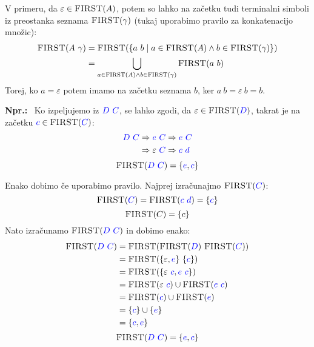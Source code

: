 \documentclass{article}
\newcommand{\Ex}{\textbf{Npr.:}\ }
\newcommand{\FIRST}{\textsc{FIRST}}
\newcommand{\Symbol}[1]{\textcolor{blue}{#1}}
\newcommand{\Null}{\varepsilon}
\newcommand{\Derive}{\Rightarrow}
\newcommand{\Seq}{\ }
\begin{document}
V primeru, da $\varepsilon \in \FIRST(A)$, potem so lahko na začetku tudi terminalni simboli iz preostanka seznama $\FIRST(\gamma)$ (tukaj uporabimo pravilo za konkatenacijo množic):
\begin{align*}
  \FIRST(A \Seq \gamma) &= \FIRST(\{a \Seq b \mid a \in \FIRST(A) \land b \in \FIRST(\gamma)\})\\
   &= \bigcup_{a \in \FIRST(A) \land b \in \FIRST(\gamma)} \FIRST(a \Seq b)
\end{align*}
Torej, ko $a = \Null$ potem imamo na začetku seznama $b$, ker $a \Seq b = \Null \Seq b = b$.

\Ex
  Ko izpeljujemo iz $\Symbol{D} \Seq \Symbol{C}$, se lahko zgodi, da $\Null \in \FIRST(\Symbol{D})$, takrat je na začetku $\Symbol{c} \in \FIRST(\Symbol{C})$:
  \begin{equation*}
    \Symbol{D} \Seq \Symbol{C} \begin{aligned}[t]
      &\Derive \Symbol{e} \Seq \Symbol{C} \Derive \Symbol{e} \Seq \Symbol{C} \\
      &\Derive \Null \Seq \Symbol{C} \Derive \Symbol{c} \Seq \Symbol{d} \\
    \end{aligned}
  \end{equation*}
  \begin{equation*}
    \FIRST(\Symbol{D} \Seq \Symbol{C}) = \{\Symbol{e}, \Symbol{c}\}
  \end{equation*}

  Enako dobimo če uporabimo pravilo.
  Najprej izračunajmo $\FIRST(\Symbol{C})$:
  \begin{equation*}
    \FIRST(\Symbol{C}) = \FIRST(\Symbol{c} \Seq \Symbol{d}) = \{\Symbol{c}\}
  \end{equation*}
  \begin{equation*}
    \FIRST(C) = \{c\}
  \end{equation*}
  Nato izračunamo $\FIRST(\Symbol{D} \Seq \Symbol{C})$ in dobimo enako:
  \begin{equation*}
    \begin{aligned}
      \FIRST(\Symbol{D} \Seq \Symbol{C}) &= \FIRST(\FIRST(\Symbol{D}) \Seq \FIRST(\Symbol{C}))\\
                &= \FIRST(\{\Null, \Symbol{e}\} \Seq \{\Symbol{c}\})\\
                &= \FIRST(\{\Null \Seq \Symbol{c}, \Symbol{e} \Seq \Symbol{c}\})\\
                &= \FIRST(\Null \Seq \Symbol{c}) \cup \FIRST(\Symbol{e} \Seq \Symbol{c})\\
                &= \FIRST(\Symbol{c}) \cup \FIRST(\Symbol{e})\\
                &= \{\Symbol{c}\} \cup \{\Symbol{e}\}\\
                &= \{\Symbol{c}, \Symbol{e}\}
    \end{aligned}
  \end{equation*}
  \begin{equation*}
    \FIRST(\Symbol{D} \Seq \Symbol{C}) = \{\Symbol{e}, \Symbol{c}\}
  \end{equation*}
\end{document}
